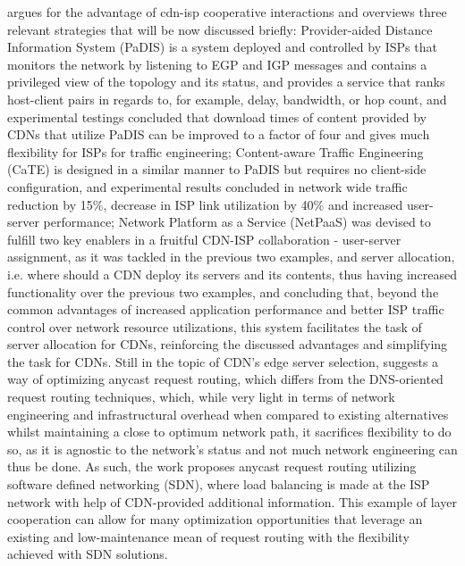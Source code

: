         \cite{cdn-isp-cooperations} argues for the advantage of cdn-isp cooperative interactions and overviews three relevant strategies that will be now discussed briefly: Provider-aided Distance Information System (PaDIS) \cite{pfa-10} is a system deployed and controlled by ISPs that monitors the network by listening to EGP and IGP messages and contains a privileged view of the topology and its status, and provides a service that ranks host-client pairs in regards to, for example, delay, bandwidth, or hop count, and experimental testings concluded that download times of content provided by CDNs that utilize PaDIS can be improved to a factor of four and gives much flexibility for ISPs for traffic engineering; Content-aware Traffic Engineering (CaTE) \cite{fps-12} is designed in a similar manner to PaDIS but requires no client-side configuration, and experimental results concluded in network wide traffic reduction by 15\%, decrease in ISP link utilization by 40\% and increased user-server performance; Network Platform as a Service (NetPaaS) \cite{fpl-13} was devised to fulfill two key enablers in a fruitful CDN-ISP collaboration - user-server assignment, as it was tackled in the previous two examples, and server allocation, i.e. where should a CDN deploy its servers and its contents, thus having increased functionality over the previous two examples, and concluding that, beyond the common advantages of increased application performance and better ISP traffic control over network resource utilizations, this system facilitates the task of server allocation for CDNs, reinforcing the discussed advantages and simplifying the task for CDNs.
        Still in the topic of CDN's edge server selection, \cite{wichtlhuber2017} suggests a way of optimizing anycast request routing, which differs from the DNS-oriented request routing techniques, which, while very light in terms of network engineering and infrastructural overhead when compared to existing alternatives whilst maintaining a close to optimum network path, it sacrifices flexibility to do so, as it is agnostic to the network's status and not much network engineering can thus be done.
        As such, the work proposes anycast request routing utilizing software defined networking (SDN), where load balancing is made at the ISP network with help of CDN-provided additional information.
        This example of layer cooperation can allow for many optimization opportunities that leverage an existing and low-maintenance mean of request routing with the flexibility achieved with SDN solutions.

